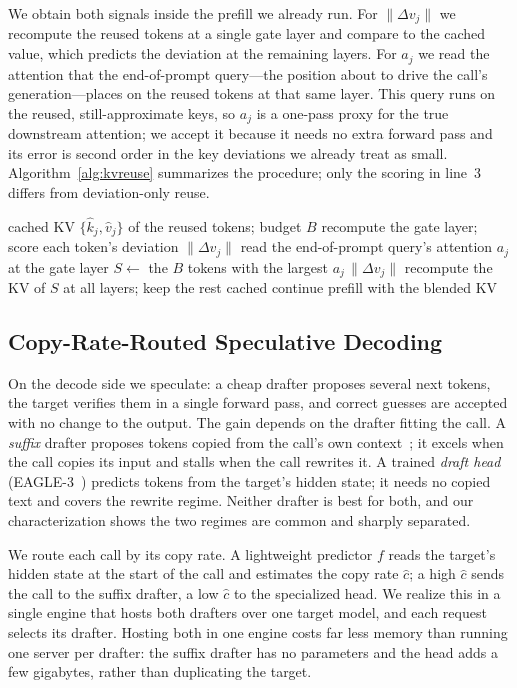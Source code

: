 We obtain both signals inside the prefill we already run. For $\|\Delta v_j\|$ we recompute the reused tokens at a single gate layer and compare to the cached value, which predicts the deviation at the remaining layers. For $a_j$ we read the attention that the end-of-prompt query---the position about to drive the call's generation---places on the reused tokens at that same layer. This query runs on the reused, still-approximate keys, so $a_j$ is a one-pass proxy for the true downstream attention; we accept it because it needs no extra forward pass and its error is second order in the key deviations we already treat as small. Algorithm~\ref{alg:kvreuse} summarizes the procedure; only the scoring in line~3 differs from deviation-only reuse.

\begin{algorithm}[t]
\caption{Attention-guided selective recomputation for one call}
\label{alg:kvreuse}
\begin{algorithmic}[1]
\REQUIRE cached KV $\{\hat k_j,\hat v_j\}$ of the reused tokens; budget $B$
\STATE recompute the gate layer; score each token's deviation $\|\Delta v_j\|$
\STATE read the end-of-prompt query's attention $a_j$ at the gate layer
\STATE $S \leftarrow$ the $B$ tokens with the largest $a_j\,\|\Delta v_j\|$
\STATE recompute the KV of $S$ at all layers; keep the rest cached
\STATE continue prefill with the blended KV
\end{algorithmic}
\end{algorithm}

\subsection{Copy-Rate-Routed Speculative Decoding}
\label{sec:decode}

On the decode side we speculate: a cheap drafter proposes several next tokens, the target verifies them in a single forward pass, and correct guesses are accepted with no change to the output. The gain depends on the drafter fitting the call. A \emph{suffix} drafter proposes tokens copied from the call's own context~\cite{suffixdecoding}; it excels when the call copies its input and stalls when the call rewrites it. A trained \emph{draft head} (EAGLE-3~\cite{eagle3}) predicts tokens from the target's hidden state; it needs no copied text and covers the rewrite regime. Neither drafter is best for both, and our characterization shows the two regimes are common and sharply separated.

We route each call by its copy rate. A lightweight predictor $f$ reads the target's hidden state at the start of the call and estimates the copy rate $\hat c$; a high $\hat c$ sends the call to the suffix drafter, a low $\hat c$ to the specialized head. We realize this in a single engine that hosts both drafters over one target model, and each request selects its drafter. Hosting both in one engine costs far less memory than running one server per drafter: the suffix drafter has no parameters and the head adds a few gigabytes, rather than duplicating the target.

